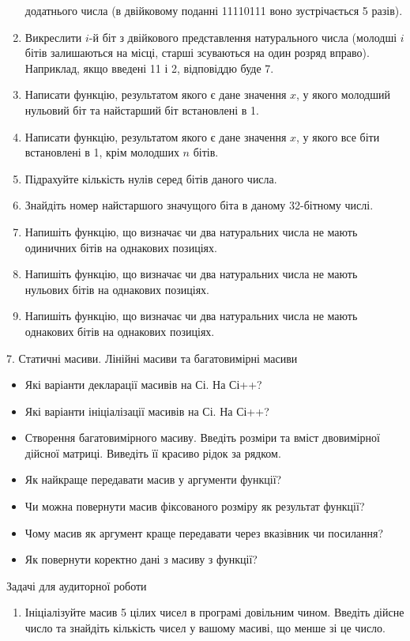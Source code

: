 \documentclass[]{article}
\begin{document}
\begin{enumerate}
  додатнього числа (в двійковому поданні 11110111 воно зустрічається 5
  разів).
\item
  Викреслити $i$-й біт з двійкового представлення натурального числа
  (молодші $i$ бітів залишаються на місці, старші зсуваються на один
  розряд вправо). Наприклад, якщо введені 11 і 2, відповіддю буде 7.
\item
  Написати функцію, результатом якого є дане значення $x$, у якого молодший нульовий біт та найстарший
  біт встановлені в 1.
\item
  Написати функцію, результатом якого є дане значення $x$, у якого все
  біти встановлені в 1, крім молодших $n$ бітів.
\item
  Підрахуйте кількість нулів серед бітів даного числа.
\item
  Знайдіть номер найстаршого значущого біта в даному 32-бітному числі.
\item
  Напишіть функцію, що визначає чи два натуральних числа не мають
  одиничних бітів на однакових позиціях.
\item
  Напишіть функцію, що визначає чи два натуральних числа не мають
  нульових бітів на однакових позиціях.
\item
  Напишіть функцію, що визначає чи два натуральних числа не мають
  однакових бітів на однакових позиціях.
\end{enumerate}

7. Статичні масиви. Лінійні масиви та багатовимірні масиви

\begin{itemize}
\item
  Які варіанти декларації масивів на Сі. На Сі++?
\item
  Які варіанти ініціалізації масивів на Сі. На Сі++?
\item
  Створення багатовимірного масиву. Введіть розміри та вміст двовимірної
  дійсної матриці. Виведіть її красиво рідок за рядком.
\item
  Як найкраще передавати масив у аргументи функції?
\item
  Чи можна повернути масив фіксованого розміру як результат функції?
\item
  Чому масив як аргумент краще передавати через вказівник чи посилання?
\item
  Як повернути коректно дані з масиву з функції?
\end{itemize}

Задачі для аудиторної роботи

\begin{enumerate}
\def\labelenumi{\arabic{enumi})}
\item
  Ініціалізуйте масив 5 цілих чисел в програмі довільним чином. Введіть
  дійсне число та знайдіть кількість чисел у вашому масиві, що менше зі
  це число.
\end{enumerate}
\end{document}
